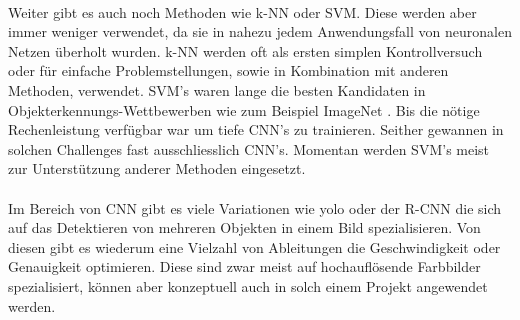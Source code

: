 \\
Weiter gibt es auch noch Methoden wie \gls{k-NN} oder \gls{SVM}. Diese werden aber immer weniger verwendet, da sie in nahezu jedem Anwendungsfall von neuronalen Netzen überholt wurden. \gls{k-NN} werden oft als ersten simplen Kontrollversuch oder für einfache Problemstellungen, sowie in Kombination mit anderen Methoden, verwendet. \gls{SVM}'s waren lange die besten Kandidaten in Objekterkennungs-Wettbewerben wie zum Beispiel ImageNet \parencite{ILSVRC15}. Bis die nötige Rechenleistung verfügbar war um tiefe \gls{CNN}'s zu trainieren. Seither gewannen in solchen Challenges fast ausschliesslich \gls{CNN}'s. Momentan werden \gls{SVM}'s meist zur Unterstützung anderer Methoden eingesetzt.\\
\\
Im Bereich von \gls{CNN} gibt es viele Variationen wie \gls{yolo} oder der \gls{R-CNN} \parencite{yoloRCnn} die sich auf das Detektieren von mehreren Objekten in einem Bild spezialisieren. Von diesen gibt es wiederum eine Vielzahl von Ableitungen die Geschwindigkeit oder Genauigkeit optimieren. Diese sind zwar meist auf hochauflösende Farbbilder spezialisiert, können aber konzeptuell auch in solch einem Projekt angewendet werden.

